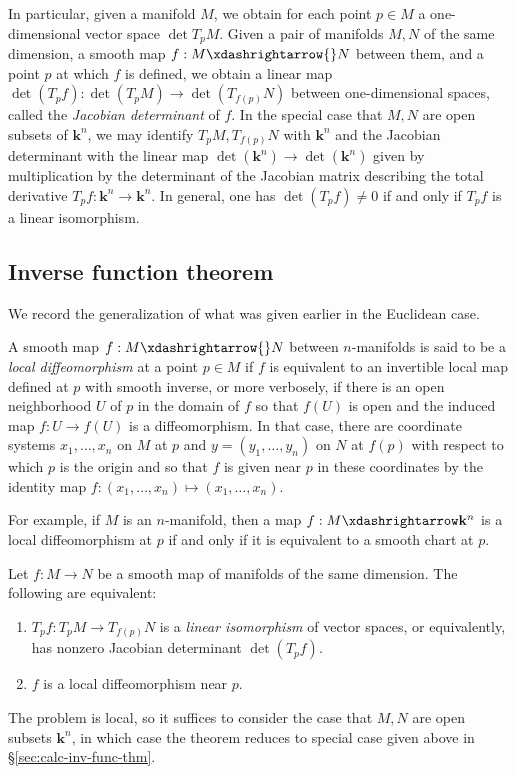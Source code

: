 \documentclass[reqno]{amsart} 
\begin{document}
In particular, given a manifold $M$,
we obtain for each point $p \in M$
a one-dimensional vector space $\det T_p M$.
Given a pair of manifolds $M,N$ of the same dimension,
a smooth map $f : M \xdashrightarrow{} N$ between them,
and a point $p$ at which $f$ is defined,
we obtain a linear map
$\det(T_p f) : \det(T_p M) \rightarrow \det(T_{f(p)} N)$
between one-dimensional spaces,
called the \emph{Jacobian determinant} of $f$.
In the special case that $M,N$ are open subsets
of $\mathbf{k}^n$,
we may identify $T_p M, T_{f(p)} N$ with $\mathbf{k}^n$
and
the Jacobian determinant
with the linear map
$\det(\mathbf{k}^n) \rightarrow \det(\mathbf{k}^n)$
given by multiplication by
the determinant of the
Jacobian matrix
describing the
total derivative
$T_p f : \mathbf{k}^n \rightarrow \mathbf{k}^n$.
In general,
one has
$\det(T_p f) \neq 0$ if and only if $T_p f$ is a linear
isomorphism.

\subsection{Inverse function theorem\label{sec:diff-geom-inv-func-thm}}
\label{sec:org63376d9}
We record the generalization
of what was given earlier in the Euclidean case.
\begin{definition}
  A smooth map $f : M \xdashrightarrow{} N$ between $n$-manifolds is
  said to be a \emph{local diffeomorphism} at a point $p \in M$
  if $f$ is equivalent to an invertible local map defined at
  $p$ with smooth inverse, or more verbosely, if there is an
  open neighborhood $U$ of $p$ in the domain of $f$ so that
  $f(U)$ is open and the induced map $f : U \rightarrow f(U)$ is
  a diffeomorphism.  In that case,
  there are
  coordinate systems $x_1,\dotsc,x_n$
  on $M$ at $p$
  and $y = (y_1,\dotsc,y_n)$ on $N$ at $f(p)$
  with respect to which $p$ is the origin and
  so that $f$ is given near $p$ in these coordinates
  by the identity map $f : (x_1,\dotsc,x_n) \mapsto (x_1,\dotsc,x_n)$.
\end{definition}
For example, if $M$ is an $n$-manifold,
then a map $f : M \xdashrightarrow \mathbf{k}^n$
is a local diffeomorphism at $p$ if and only if it is equivalent
to a smooth chart at $p$.
\begin{theorem}
  Let $f : M \rightarrow N$ be a smooth map of manifolds of the same dimension.
  The following are equivalent:
  \begin{enumerate}
\item $T_p f : T_p M \rightarrow T_{f(p)} N$
  is a \emph{linear isomorphism} of vector spaces,
  or equivalently, has nonzero Jacobian determinant
  $\det(T_p f)$.
\item $f$ is a local diffeomorphism near $p$.
\end{enumerate}
\end{theorem}
The problem is local,
so it suffices to consider the case that $M,N$ are open subsets
$\mathbf{k}^n$, in which case the theorem reduces to
special case given above in \S\ref{sec:calc-inv-func-thm}.
\end{document}
